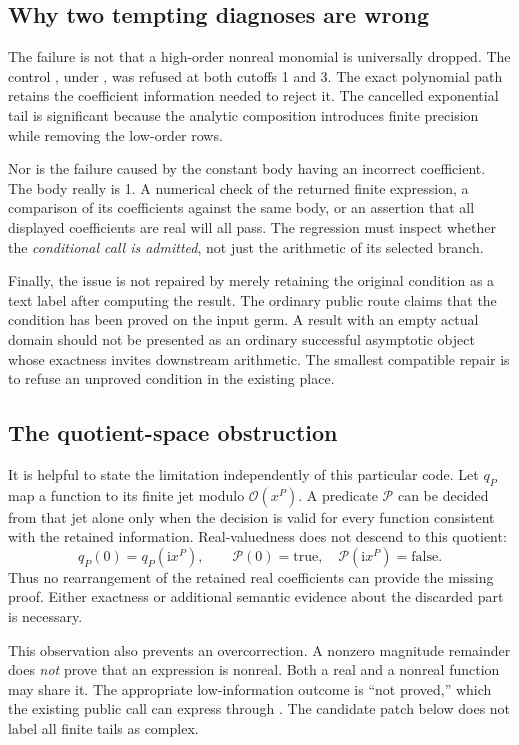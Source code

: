 \documentclass[11pt,letterpaper]{article}
\newcommand{\code}[1]{\texttt{\small\detokenize{#1}}}
\newcommand{\OO}{\mathcal O}
\newcommand{\ii}{\mathrm i}
\begin{document}
\subsection{Why two tempting diagnoses are wrong}
The failure is not that a high-order nonreal monomial is universally dropped. The control \code{Element[a z^2, Reals]}, under \code{a^2 == -1}, was refused at both cutoffs 1 and 3. The exact polynomial path retains the coefficient information needed to reject it. The cancelled exponential tail is significant because the analytic composition introduces finite precision while removing the low-order rows.

Nor is the failure caused by the constant body having an incorrect coefficient. The body really is 1. A numerical check of the returned finite expression, a comparison of its coefficients against the same body, or an assertion that all displayed coefficients are real will all pass. The regression must inspect whether the \emph{conditional call is admitted}, not just the arithmetic of its selected branch.

Finally, the issue is not repaired by merely retaining the original condition as a text label after computing the result. The ordinary public route claims that the condition has been proved on the input germ. A result with an empty actual domain should not be presented as an ordinary successful asymptotic object whose exactness invites downstream arithmetic. The smallest compatible repair is to refuse an unproved condition in the existing place.

\subsection{The quotient-space obstruction}
It is helpful to state the limitation independently of this particular code. Let \(q_P\) map a function to its finite jet modulo \(\OO(x^P)\). A predicate \(\mathcal P\) can be decided from that jet alone only when the decision is valid for every function consistent with the retained information. Real-valuedness does not descend to this quotient:
\[
 q_P(0)=q_P(\ii x^P),\qquad
 \mathcal P(0)=\text{true},\quad
 \mathcal P(\ii x^P)=\text{false}.
\]
Thus no rearrangement of the retained real coefficients can provide the missing proof. Either exactness or additional semantic evidence about the discarded part is necessary.

This observation also prevents an overcorrection. A nonzero magnitude remainder does \emph{not} prove that an expression is nonreal. Both a real and a nonreal function may share it. The appropriate low-information outcome is ``not proved,'' which the existing public call can express through \code{IncompatibleObservableCondition}. The candidate patch below does not label all finite tails as complex.
\end{document}
